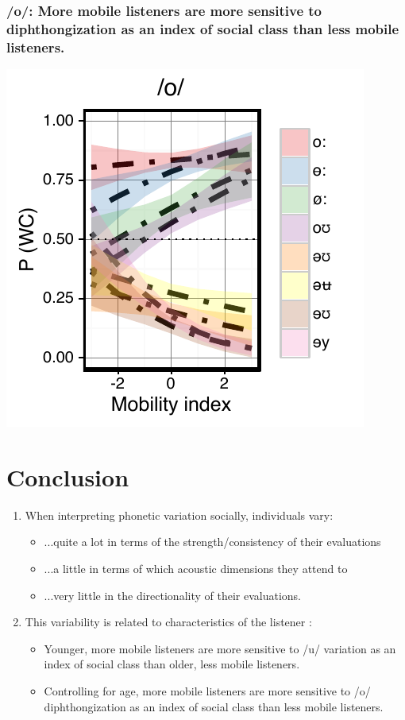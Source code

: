 \documentclass[a0,final]{a0poster}
\begin{document}
\begin{multicols}{4}
\subsubsection*{/o/: More mobile listeners are more sensitive to diphthongization as an index of social class than less mobile listeners.}
\centering
\includegraphics[scale=2]{o_perception_dim3_sd.pdf}
\justify
\vspace*{-2.75cm}
\section*{Conclusion}
\vspace*{-.5cm}
\begin{enumerate}
\item{When interpreting phonetic variation socially, individuals vary:\vspace*{0.5cm}\begin{itemize}\item{...quite a lot in terms of the strength/consistency of their evaluations}\item{...a little in terms of which acoustic dimensions they attend to}\item{...very little in the directionality of their evaluations.}\end{itemize}}
\vspace*{0.5cm}
\item{This variability is related to characteristics of the listener :\vspace*{0.5cm}\begin{itemize}\item{Younger, more mobile listeners are more sensitive to /u/ variation as an index of social class than older, less mobile listeners.}\item{Controlling for age, more mobile listeners are more sensitive to /o/ diphthongization as an index of social class than less mobile listeners.}\end{itemize}}
\end{enumerate}


\end{multicols}
\end{document}
